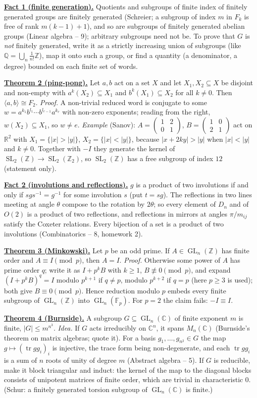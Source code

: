 \documentclass[11pt,a4paper]{article}
\newcommand{\head}[1]{\par\medskip\noindent\textbf{\underline{#1}}\quad}
\DeclareMathOperator{\GL}{GL}
\DeclareMathOperator{\SL}{SL}
\DeclareMathOperator{\tr}{tr}
\newcommand{\Z}{\mathbb Z}
\newcommand{\bm}[4]{\left(\begin{smallmatrix}#1&#2\\#3&#4\end{smallmatrix}\right)}
\begin{document}
\head{Fact 1 (finite generation).} Quotients and subgroups of finite index of finitely generated
groups are finitely generated (Schreier; a subgroup of index $m$ in $F_k$ is free of rank
$m(k-1)+1$), and so are subgroups of finitely generated abelian groups (Linear algebra -- 9);
arbitrary subgroups need not be. To prove that $G$ is \emph{not} finitely generated, write it
as a strictly increasing union of subgroups (like $\mathbb Q=\bigcup_n\frac1{n!}\Z$), map it
onto such a group, or find a quantity (a denominator, a degree) bounded on each finite set of
words.

\head{Theorem 2 (ping-pong).} Let $a,b$ act on a set $X$ and let $X_1,X_2\subseteq X$ be
disjoint and non-empty with $a^k(X_2)\subseteq X_1$ and $b^k(X_1)\subseteq X_2$ for all
$k\neq0$. Then $\langle a,b\rangle\cong F_2$. \emph{Proof.} A non-trivial reduced word is
conjugate to some $w=a^{k_1}b^{l_1}\cdots b^{l_{r-1}}a^{k_r}$ with non-zero exponents; reading
from the right, $w(X_2)\subseteq X_1$, so $w\neq e$. \emph{Example} (Sanov): $A=\bm1201$,
$B=\bm1021$ act on $\mathbb R^2$ with $X_1=\{|x|>|y|\}$, $X_2=\{|x|<|y|\}$, because
$|x+2ky|>|y|$ when $|x|<|y|$ and $k\neq0$. Together with $-I$ they generate the kernel of
$\SL_2(\Z)\to\SL_2(\Z_2)$, so $\SL_2(\Z)$ has a free subgroup of index $12$ (statement only).

\head{Fact 2 (involutions and reflections).} $g$ is a product of two involutions if and only if
$sgs^{-1}=g^{-1}$ for some involution $s$ (put $t=sg$). The reflections in two lines meeting at
angle $\theta$ compose to the rotation by $2\theta$; so every element of $D_n$ and of $O(2)$
is a product of two reflections, and reflections in mirrors at angles $\pi/m_{ij}$ satisfy the
Coxeter relations. Every bijection of a set is a product of two involutions (Combinatorics --
8, homework 2).

\head{Theorem 3 (Minkowski).} Let $p$ be an odd prime. If $A\in\GL_n(\Z)$ has finite order and
$A\equiv I\pmod p$, then $A=I$. \emph{Proof.} Otherwise some power of $A$ has prime order $q$;
write it as $I+p^kB$ with $k\geqslant1$, $B\not\equiv0\pmod p$, and expand $(I+p^kB)^q=I$ modulo
$p^{k+1}$ if $q\neq p$, modulo $p^{k+2}$ if $q=p$ (here $p\geqslant3$ is used); both give
$B\equiv0\pmod p$. Hence reduction modulo $p$ embeds every finite subgroup of $\GL_n(\Z)$ into
$\GL_n(\mathbb F_p)$. For $p=2$ the claim fails: $-I\equiv I$.

\head{Theorem 4 (Burnside).} A subgroup $G\subseteq\GL_n(\mathbb C)$ of finite exponent $m$ is
finite, $|G|\leqslant m^{n^3}$. \emph{Idea.} If $G$ acts irreducibly on $\mathbb C^n$, it spans
$M_n(\mathbb C)$ (Burnside's theorem on matrix algebras; quote it). For a basis
$g_1,\dots,g_{n^2}\in G$ the map $g\mapsto(\tr gg_i)_i$ is injective, the trace form being
non-degenerate, and each $\tr gg_i$ is a sum of $n$ roots of unity of degree $m$
(Abstract algebra -- 5). If $G$ is reducible, make it block triangular and induct: the kernel
of the map to the diagonal blocks consists of unipotent matrices of finite order, which are
trivial in characteristic $0$. (Schur: a finitely generated torsion subgroup of
$\GL_n(\mathbb C)$ is finite.)
\end{document}
